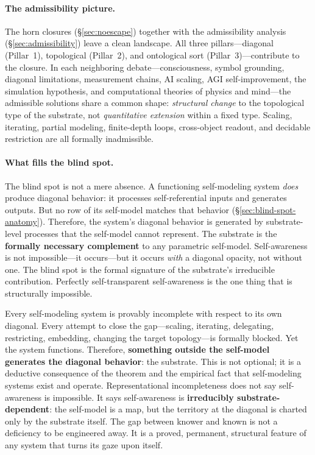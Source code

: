 \documentclass[11pt]{article}
\begin{document}
\paragraph{The admissibility picture.}
The horn closures (\S\ref{sec:noescape}) together with the
admissibility analysis (\S\ref{sec:admissibility}) leave a clean
landscape.  All three pillars---diagonal (Pillar~1), topological
(Pillar~2), and ontological sort (Pillar~3)---contribute to the
closure.  In each neighboring debate---consciousness,
symbol grounding, diagonal limitations, measurement chains, AI
scaling, AGI self-improvement, the simulation hypothesis, and
computational theories of physics and mind---the admissible solutions
share a common shape:
\emph{structural change} to the topological type of the substrate,
not \emph{quantitative extension} within a fixed type.  Scaling,
iterating, partial modeling, finite-depth loops, cross-object readout,
and decidable restriction are all formally inadmissible.

\paragraph{What fills the blind spot.}
The blind spot is not a mere absence.  A functioning self-modeling
system \emph{does} produce diagonal behavior: it processes
self-referential inputs and generates outputs.  But no row of its
self-model matches that behavior
(\S\ref{sec:blind-spot-anatomy}).  Therefore, the system's diagonal
behavior is generated by substrate-level processes that the
self-model cannot represent.  The substrate is the \textbf{formally
necessary complement} to any parametric self-model.  Self-awareness
is not impossible---it occurs---but it occurs \emph{with} a diagonal
opacity, not without one.  The blind spot is the formal signature of
the substrate's irreducible contribution.  Perfectly self-transparent
self-awareness is the one thing that is structurally impossible.

\begin{keybox}[title={The final picture}]
Every self-modeling system is provably incomplete with respect to its
own diagonal.  Every attempt to close the gap---scaling, iterating,
delegating, restricting, embedding, changing the target
topology---is formally blocked.  Yet the system functions.
Therefore, \textbf{something outside the self-model generates the
diagonal behavior}: the substrate.  This is not optional; it is a
deductive consequence of the theorem and the empirical fact that
self-modeling systems exist and operate.  Representational
incompleteness does not say self-awareness is impossible.  It says
self-awareness is \textbf{irreducibly substrate-dependent}: the
self-model is a map, but the territory at the diagonal is charted
only by the substrate itself.  The gap between knower and known is
not a deficiency to be engineered away.  It is a proved,
permanent, structural feature of any system that turns its gaze
upon itself.
\end{keybox}
\end{document}
